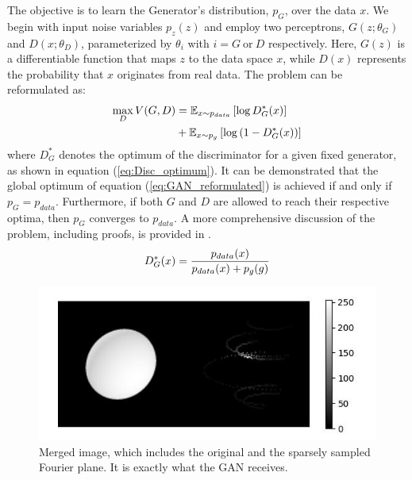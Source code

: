 The objective is to learn the Generator's distribution, \(p_G\), over the data \(x\). We begin with input noise variables \(p_z(z)\) and employ two perceptrons, \(G(z; \theta_G)\) and \(D(x; \theta_D)\), parameterized by \(\theta_i\) with \(i = G \ \mathrm{or}\ D\) respectively. Here, \(G(z)\) is a differentiable function that maps \(z\) to the data space \(x\), while \(D(x)\) represents the probability that \(x\) originates from real data. The problem can be reformulated as:
\begin{equation}
	\centering
	\begin{aligned}
		\max_{D} V(G, D) &= \mathbb{E}_{x \sim p_{data}} \left[ \log D^{*}_{G}(x) \right] \\ 
		&+ \mathbb{E}_{x \sim p_{g}} \left[ \log \left( 1 - D^{*}_{G}(x) \right) \right]
	\end{aligned}
	\label{eq:GAN_reformulated}
\end{equation}
where \(D^{*}_{G}\) denotes the optimum of the discriminator for a given fixed generator, as shown in equation (\ref{eq:Disc_optimum}). It can be demonstrated that the global optimum of equation (\ref{eq:GAN_reformulated}) is achieved if and only if \(p_G = p_{data}\). Furthermore, if both \(G\) and \(D\) are allowed to reach their respective optima, then \(p_G\) converges to \(p_{data}\). A more comprehensive discussion of the problem, including proofs, is provided in \cite{goodfellow2014generative}.
\begin{equation}
	\centering
	D^*_G(x) = \frac{p_{data}(x)}{p_{data}(x) + p_g(g)}
	\label{eq:Disc_optimum}
\end{equation}
\begin{figure}
	\centering
	\includegraphics[width=\linewidth]{fig/ellipse1612.jpg}
	\caption{Merged image, which includes the original and the sparsely sampled Fourier plane. It is exactly what the GAN receives. }
	\label{fig:GANinput}
\end{figure}
